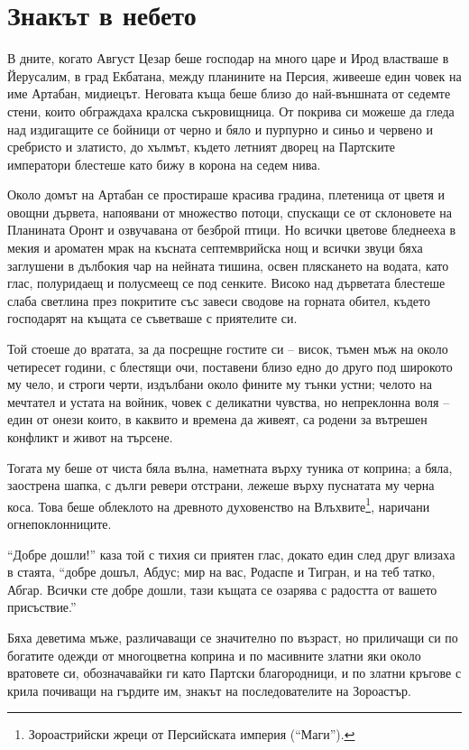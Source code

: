 \documentclass[oneside,10pt]{memoir}
\begin{document}
\newpage

\part{Знакът в небето}

В дните, когато Август Цезар беше господар на много царе и Ирод властваше в
Йерусалим, в град Екбатана, между планините на Персия, живееше един човек на име
Артабан, мидиецът. Неговата къща беше близо до най-външната от седемте стени,
които обграждаха кралска съкровищница. От покрива си можеше да гледа над
издигащите се бойници от черно и бяло и пурпурно и синьо и червено и сребристо и
златисто, до хълмът, където летният дворец на Партските императори блестеше като
бижу в корона на седем нива.

Около домът на Артабан се простираше красива градина, плетеница от цветя и
овощни дървета, напоявани от множество потоци, спускащи се от склоновете на
Планината Оронт и озвучавана от безброй птици. Но всички цветове бледнееха в
мекия и ароматен мрак на късната септемврийска нощ и всички звуци бяха заглушени
в дълбокия чар на нейната тишина, освен пляскането на водата, като глас,
полуридаещ и полусмеещ се под сенките. Високо над дърветата блестеше слаба
светлина през покритите със завеси сводове на горната обител, където господарят
на къщата се съветваше с приятелите си.

Той стоеше до вратата, за да посрещне гостите си -- висок, тъмен мъж на около
четиресет години, с блестящи очи, поставени близо едно до друго под широкото му
чело, и строги черти, издълбани около фините му тънки устни; челото на мечтател
и устата на войник, човек с деликатни чувства, но непреклонна воля -- един от
онези които, в каквито и времена да живеят, са родени за вътрешен конфликт и
живот на търсене.

Тогата му беше от чиста бяла вълна, наметната върху туника от коприна; а бяла,
заострена шапка, с дълги ревери отстрани, лежеше върху пуснатата му черна коса.
Това беше облеклото на древното духовенство на Влъхвите\footnote{Зороастрийски
жреци от Персийската империя (``Маги'').}, наричани огнепоклонниците.

``Добре дошли!'' каза той с тихия си приятен глас, докато един след друг влизаха
в стаята, ``добре дошъл, Абдус; мир на вас, Родаспе и Тигран, и на теб татко,
Абгар. Всички сте добре дошли, тази къщата се озарява с радостта от вашето
присъствие.''

Бяха деветима мъже, различаващи се значително по възраст, но приличащи си по
богатите одежди от многоцветна коприна и по масивните златни яки около вратовете
си, обозначавайки ги като Партски благородници, и по златни кръгове с крила
почиващи на гърдите им, знакът на последователите на Зороастър.
\end{document}

